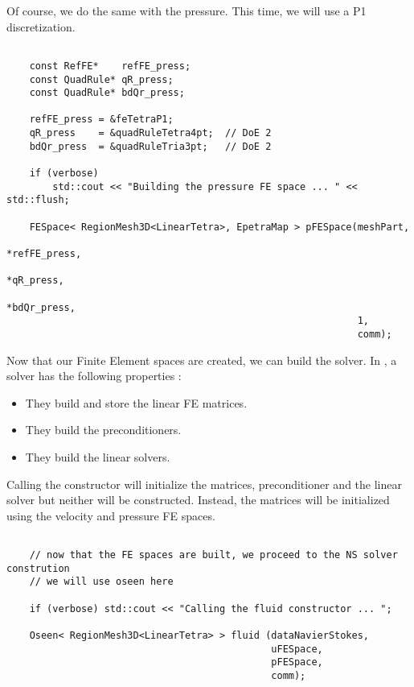 {Of course, we do the same with the pressure. This time, we will use a P1 discretization.

\begin{verbatim}

    const RefFE*    refFE_press;
    const QuadRule* qR_press;
    const QuadRule* bdQr_press;

    refFE_press = &feTetraP1;
    qR_press    = &quadRuleTetra4pt;  // DoE 2
    bdQr_press  = &quadRuleTria3pt;   // DoE 2

    if (verbose)
        std::cout << "Building the pressure FE space ... " << std::flush;

    FESpace< RegionMesh3D<LinearTetra>, EpetraMap > pFESpace(meshPart,
                                                             *refFE_press,
                                                             *qR_press,
                                                             *bdQr_press,
                                                             1,
                                                             comm);

\end{verbatim}

Now that our Finite Element spaces are created, we can build the solver. In \lifev,
a solver has the following properties :
\begin{itemize}
\item They build and store the linear FE matrices.
\item They build the preconditioners.
\item They build the linear solvers.
\end{itemize}

Calling the constructor will initialize the matrices, preconditioner and the linear solver
but neither will be constructed. Instead, the matrices will be initialized using the
velocity and pressure FE spaces.

\begin{verbatim}

    // now that the FE spaces are built, we proceed to the NS solver constrution
    // we will use oseen here

    if (verbose) std::cout << "Calling the fluid constructor ... ";

    Oseen< RegionMesh3D<LinearTetra> > fluid (dataNavierStokes,
                                              uFESpace,
                                              pFESpace,
                                              comm);



\end{verbatim}}

